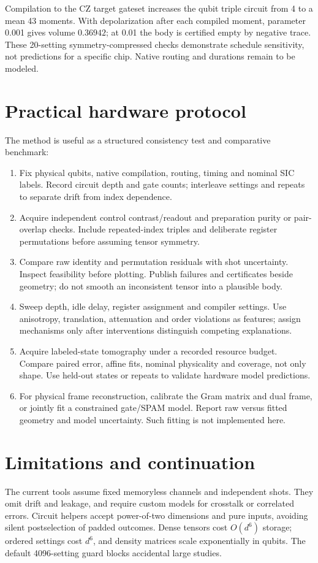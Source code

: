\documentclass[11pt]{article}
\begin{document}
Compilation to the CZ target gateset increases the qubit triple circuit from
4 to a mean 43 moments. With depolarization after each compiled moment, parameter
0.001 gives volume $0.36942$; at 0.01 the body is certified empty by negative
trace. These 20-setting symmetry-compressed checks demonstrate schedule
sensitivity, not predictions for a specific chip. Native routing and durations
remain to be modeled.

\section{Practical hardware protocol}
The method is useful as a structured consistency test and comparative benchmark:
\begin{enumerate}
\item Fix physical qubits, native compilation, routing, timing and nominal SIC
labels. Record circuit depth and gate counts; interleave settings and repeats
to separate drift from index dependence.
\item Acquire independent control contrast/readout and preparation purity or
pair-overlap checks. Include repeated-index triples and deliberate register
permutations before assuming tensor symmetry.
\item Compare raw identity and permutation residuals with shot uncertainty.
Inspect feasibility before plotting. Publish failures and certificates beside
geometry; do not smooth an inconsistent tensor into a plausible body.
\item Sweep depth, idle delay, register assignment and compiler settings.
Use anisotropy, translation, attenuation and order violations as features;
assign mechanisms only after interventions distinguish competing explanations.
\item Acquire labeled-state tomography under a recorded resource budget.
Compare paired error, affine fits, nominal physicality and coverage, not only
shape. Use held-out states or repeats to validate hardware model predictions.
\item For physical frame reconstruction, calibrate the Gram matrix and dual
frame, or jointly fit a constrained gate/SPAM model. Report raw versus fitted
geometry and model uncertainty. Such fitting is not implemented here.
\end{enumerate}

\section{Limitations and continuation}
The current tools assume fixed memoryless channels and independent shots. They
omit drift and leakage, and require custom models for crosstalk or correlated
errors. Circuit helpers accept power-of-two dimensions and pure inputs, avoiding
silent postselection of padded outcomes. Dense tensors cost $O(d^6)$ storage;
ordered settings cost $d^6$, and density matrices scale exponentially in qubits.
The default 4096-setting guard blocks accidental large studies.
\end{document}
